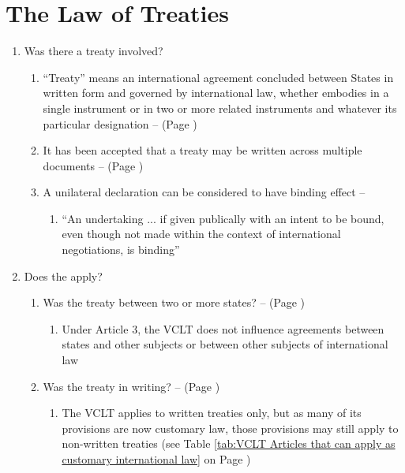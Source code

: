 \section{The Law of Treaties}\label{scaffold:Topic 3}
\begin{enumerate}
    \item Was there a treaty involved?
    \begin{enumerate}
        \item ``Treaty'' means an international agreement concluded between States in written form and governed by international law, whether embodies in a single instrument or in two or more related instruments and whatever its particular designation --  (Page \pageref{VCLT Art 2})
        \item It has been accepted that a treaty may be written across multiple documents --  (Page \pageref{case:Qatar v Bahrain})
        \item A unilateral declaration can be considered to have binding effect -- 
        \begin{enumerate}
            \item ``An undertaking ... if given publically with an intent to be bound, even though not made within the context of international negotiations, is binding''
        \end{enumerate}
    \end{enumerate}
    \item Does the  apply?
    \begin{enumerate}
        \item Was the treaty between two or more states? --  (Page \pageref{VCLT Art 3})
        \begin{enumerate}
            \item Under Article 3, the VCLT does not influence agreements between states and other subjects or between other subjects of international law
        \end{enumerate}
        \item Was the treaty in writing? --  (Page \pageref{VCLT Art 3})
        \begin{enumerate}
            \item The VCLT applies to written treaties only, but as many of its provisions are now customary law, those provisions may still apply to non-written treaties (see Table \ref{tab:VCLT Articles that can apply as customary international law} on Page \pageref{tab:VCLT Articles that can apply as customary international law})

\end{enumerate}
\end{enumerate}
\end{enumerate}
